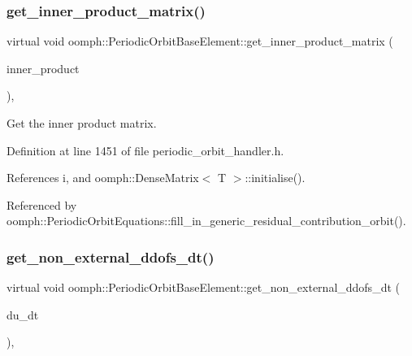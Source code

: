\subsubsection{\texorpdfstring{get\+\_\+inner\+\_\+product\+\_\+matrix()}{get\_inner\_product\_matrix()}}
{\footnotesize\ttfamily virtual void oomph\+::\+Periodic\+Orbit\+Base\+Element\+::get\+\_\+inner\+\_\+product\+\_\+matrix (\begin{DoxyParamCaption}\item[{\hyperlink{classoomph_1_1DenseMatrix}{Dense\+Matrix}$<$ double $>$ \&}]{inner\+\_\+product }\end{DoxyParamCaption})\hspace{0.3cm}{\ttfamily [inline]}, {\ttfamily [virtual]}}



Get the inner product matrix. 



Definition at line 1451 of file periodic\+\_\+orbit\+\_\+handler.\+h.



References i, and oomph\+::\+Dense\+Matrix$<$ T $>$\+::initialise().



Referenced by oomph\+::\+Periodic\+Orbit\+Equations\+::fill\+\_\+in\+\_\+generic\+\_\+residual\+\_\+contribution\+\_\+orbit().

\mbox{\label{classoomph_1_1PeriodicOrbitBaseElement_a115fb7538cac83389818170a6b36bdcc}} 
\subsubsection{\texorpdfstring{get\+\_\+non\+\_\+external\+\_\+ddofs\+\_\+dt()}{get\_non\_external\_ddofs\_dt()}}
{\footnotesize\ttfamily virtual void oomph\+::\+Periodic\+Orbit\+Base\+Element\+::get\+\_\+non\+\_\+external\+\_\+ddofs\+\_\+dt (\begin{DoxyParamCaption}\item[{\hyperlink{classoomph_1_1Vector}{Vector}$<$ double $>$ \&}]{du\+\_\+dt }\end{DoxyParamCaption})\hspace{0.3cm}{\ttfamily [inline]}, {\ttfamily [virtual]}}

